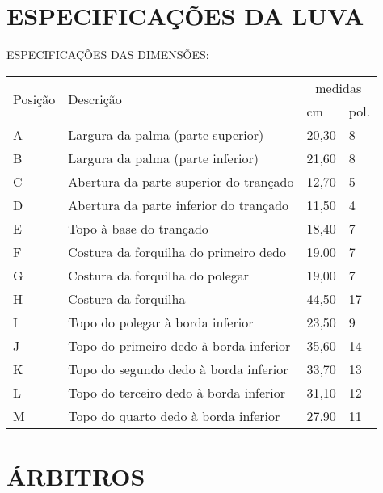 \chapter{ESPECIFICAÇÕES DA LUVA}
\minitoc%

ESPECIFICAÇÕES DAS DIMENSÕES:


	\begin{tabular}{llll}\hline
	\multirow{2}{*}{Posição} &
	\multirow{2}{*}{Descrição}&
	\multicolumn{2}{c}{medidas}\\
	&&cm & pol.\\\hline
	A& Largura da palma (parte superior)&20,30&8\\\hline
	B& Largura da palma (parte inferior)&21,60&8 \textonehalf \\\hline
	C& Abertura da parte superior do trançado&12,70&5 \\\hline
	D&  Abertura da parte inferior do trançado&11,50&4 \textonehalf \\\hline
	E&  Topo à base do trançado&18,40&7 \textonequarter{}  \\\hline
	F&  Costura da forquilha do primeiro dedo&19,00&7 \textonehalf \\\hline
	G&  Costura da forquilha do polegar&19,00&7 \textonehalf \\\hline
	H&  Costura da forquilha&44,50&17 \textonehalf \\\hline
	I&  Topo do polegar à borda inferior&23,50&9 \textonequarter{} \\\hline
	J&  Topo do primeiro dedo à borda inferior&35,60&14\\\hline
	K&   Topo do segundo dedo à borda inferior&33,70&13 \textonequarter{} \\\hline
	L&  Topo do terceiro dedo à borda inferior&31,10&12 \textonequarter{} \\\hline
	M& Topo do quarto dedo à borda inferior&27,90&11 \\\hline

\end{tabular}















\chapter{ÁRBITROS}
\minitoc%

